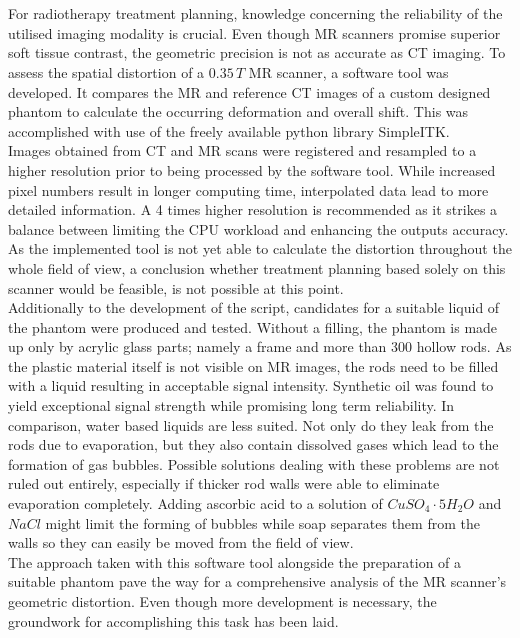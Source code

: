 \let\oldcleardoublepage\cleardoublepage
\renewcommand\cleardoublepage{}

\chapter*{\abstractname}

For radiotherapy treatment planning, knowledge concerning the reliability of the utilised imaging modality is crucial.
Even though MR scanners promise superior soft tissue contrast, the geometric precision is not as accurate as CT imaging.
To assess the spatial distortion of a $0.35\, T$ MR scanner, a software tool was developed.
It compares the MR and reference CT images of a custom designed phantom to calculate the occurring deformation and overall shift.
This was accomplished with use of the freely available python library {SimpleITK}.\\
Images obtained from CT and MR scans were registered and resampled to a higher resolution prior to being processed by the software tool.
While increased pixel numbers result in longer computing time, interpolated data lead to more detailed information.
A 4 times higher resolution is recommended as it strikes a balance between limiting the CPU workload and enhancing the outputs accuracy.
As the implemented tool is not yet able to calculate the distortion throughout the whole field of view, a conclusion whether treatment planning based solely on this scanner would be feasible, is not possible at this point.\\

Additionally to the development of the script, candidates for a suitable liquid of the phantom were produced and tested.
Without a filling, the phantom is made up only by acrylic glass parts; namely a frame and more than 300 hollow rods.
As the plastic material itself is not visible on MR images, the rods need to be filled with a liquid resulting in acceptable signal intensity.
Synthetic oil was found to yield exceptional signal strength while promising long term reliability.
In comparison, water based liquids are less suited.
Not only do they leak from the rods due to evaporation, but they also contain dissolved gases which lead to the formation of gas bubbles.
Possible solutions dealing with these problems are not ruled out entirely, especially if thicker rod walls were able to eliminate evaporation completely.
Adding ascorbic acid to a solution of $CuSO_4\cdot5H_2O$ and $NaCl$ might limit the forming of bubbles while soap separates them from the walls so they can easily be moved from the field of view.\\

The approach taken with this software tool alongside the preparation of a suitable phantom pave the way for a comprehensive analysis of the MR scanner's geometric distortion.
Even though more development is necessary, the groundwork for accomplishing this task has been laid.


\let\cleardoublepage\oldcleardoublepage
\newpage
